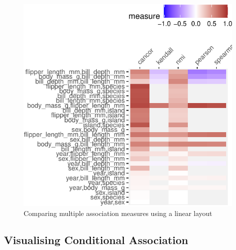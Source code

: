 \begin{Schunk}
\begin{figure}

{\centering \includegraphics{rj_paper_files/figure-latex/compare-linear-1} 

}

\caption[Comparing multiple association measures using a linear layout]{Comparing multiple association measures using a linear layout}\label{fig:compare-linear}
\end{figure}
\end{Schunk}

\hypertarget{visualising-conditional-association}{%
\subsection{Visualising Conditional
Association}\label{visualising-conditional-association}}

